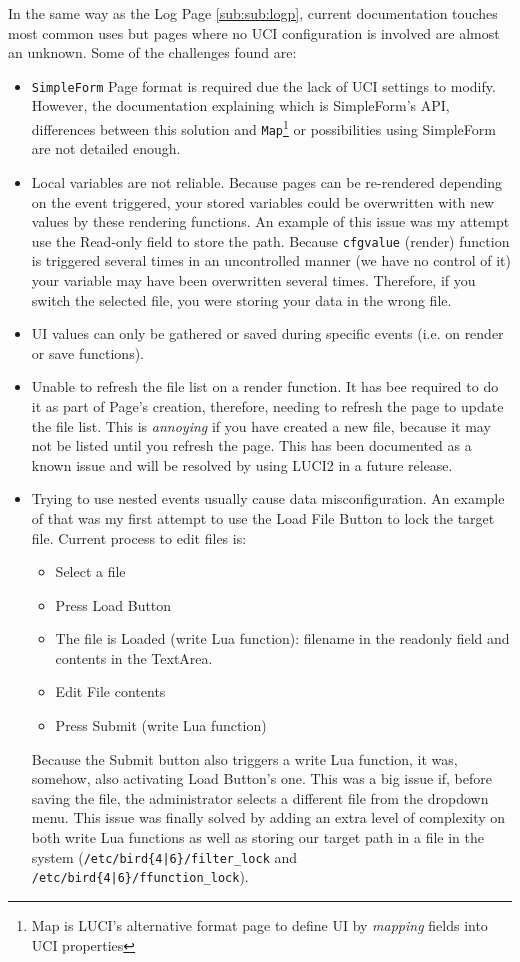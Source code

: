 In the same way as the Log Page \ref{sub:sub:logp}, current documentation touches most common uses but pages where no UCI configuration is involved are almost an unknown. Some of the challenges found are:
\begin{itemize}
    \item \texttt{SimpleForm} Page format is required due the lack of UCI settings to modify. However, the documentation explaining which is SimpleForm's API, differences between this solution and \texttt{Map}\footnote{Map is LUCI's alternative format page to define UI by \textit{mapping} fields into UCI properties} or possibilities using SimpleForm are not detailed enough.
    \item Local variables are not reliable. Because pages can be re-rendered depending on the event triggered, your stored variables could be overwritten with new values by these rendering functions.
    An example of this issue was my attempt use the Read-only field to store the path. Because \texttt{cfgvalue} (render) function is triggered several times in an uncontrolled manner (we have no control of it) your variable may have been overwritten several times. Therefore, if you switch the selected file, you were storing your data in the wrong file.
    \item UI values can only be gathered or saved during specific events (i.e. on render or save functions).
    \item Unable to refresh the file list on a render function. It has bee required to do it as part of Page's creation, therefore, needing to refresh the page to update the file list. This is \textit{annoying} if you have created a new file, because it may not be listed until you refresh the page.
    This has been documented as a known issue and will be resolved by using LUCI2 in a future release. 
    \item Trying to use nested events usually cause data misconfiguration.
    An example of that was my first attempt to use the Load File Button to lock the target file. Current process to edit files is: 
    \begin{itemize}
        \item Select a file
        \item Press Load Button
        \item The file is Loaded (write Lua function): filename in the readonly field and contents in the TextArea.
        \item Edit File contents
        \item Press Submit (write Lua function)
    \end{itemize}
    Because the Submit button also triggers a write Lua function, it was, somehow, also activating Load Button's one. This was a big issue if, before saving the file, the administrator selects a different file from the dropdown menu.
    This issue was finally solved by adding an extra level of complexity on both write Lua functions as well as storing our target path in a file in the system (\texttt{/etc/bird\{4|6\}/filter\_lock} and \texttt{/etc/bird\{4|6\}/ffunction\_lock}).
\end{itemize}

